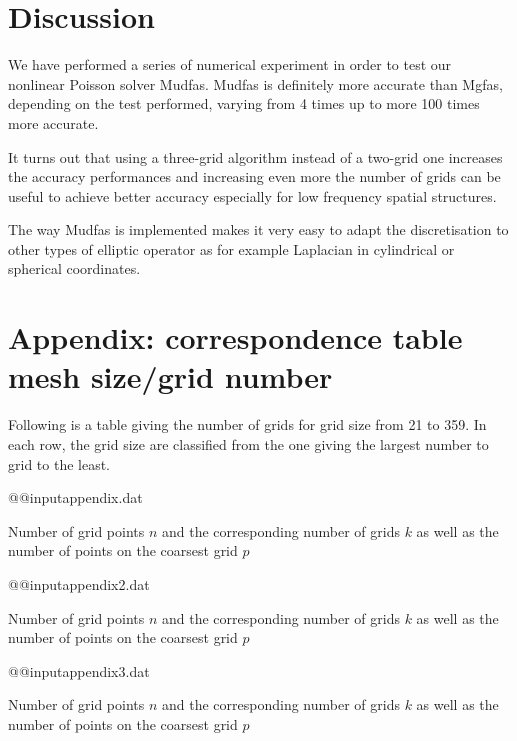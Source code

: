 \documentclass[10pt,a4paper]{article}
\newcommand*{\mgfas}{\textsf{Mgfas}\xspace}
\newcommand*{\mudfas}{\textsf{Mudfas}\xspace}
\def\tablesize{\small}
\begin{document}
\section{Discussion}

We have performed a series of numerical experiment in order to test our
nonlinear Poisson solver \mudfas.
\mudfas is definitely more accurate than \mgfas, depending on the test
performed, varying from 4 times up to more 100 times more accurate.

It turns out that using a three-grid algorithm instead of a two-grid one
increases the accuracy performances and increasing even more the number of
grids can be useful to achieve better accuracy especially for low frequency
spatial structures.

The way \mudfas is implemented makes it very easy to adapt the
discretisation to other types of elliptic operator as for example Laplacian
in cylindrical or spherical coordinates.



\section*{Appendix: correspondence table  mesh size/grid number}

Following is a table giving the number of grids for grid size from 21 to
359. In each row, the grid size are classified from the one giving the
largest number to grid to the least.

\begin{table}[h]
\centerline{\tablesize \csname @@input\endcsname appendix.dat}
\caption{Number of grid points $n$ and the corresponding number of grids $k$
as well as the number of points on the coarsest grid $p$ }
\label{table:appendix}
\end{table}

\begin{table}[h]
\centerline{\tablesize \csname @@input\endcsname appendix2.dat}
\caption{Number of grid points $n$ and the corresponding number of grids $k$
as well as the number of points on the coarsest grid $p$ }
\label{table:appendix2}
\end{table}

\begin{table}[h]
\centerline{\tablesize \csname @@input\endcsname appendix3.dat}
\caption{Number of grid points $n$ and the corresponding number of grids $k$
as well as the number of points on the coarsest grid $p$ }
\label{table:appendix3}
\end{table}
\end{document}
